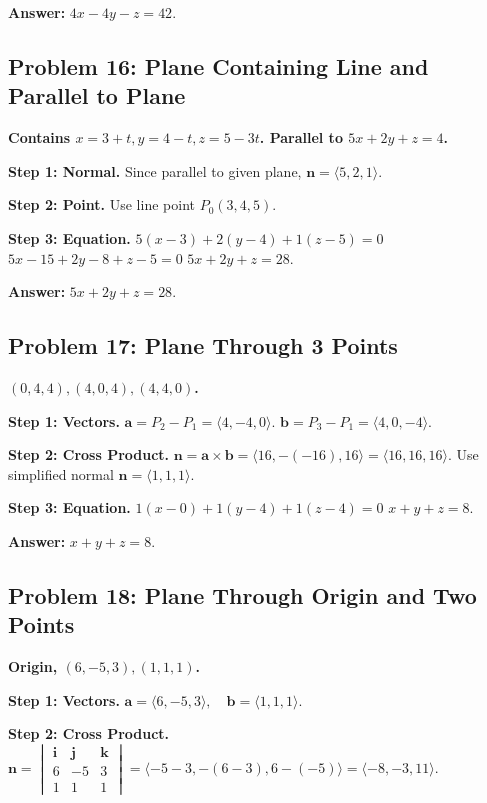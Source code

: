 \documentclass[11pt]{article}
\begin{document}
\textbf{Answer:}
$4x - 4y - z = 42$.

\hrulefill

\subsection*{Problem 16: Plane Containing Line and Parallel to Plane}
\textbf{Contains $x=3+t, y=4-t, z=5-3t$. Parallel to $5x + 2y + z = 4$.}

\textbf{Step 1: Normal.}
Since parallel to given plane, $\mathbf{n} = \langle 5, 2, 1 \rangle$.

\textbf{Step 2: Point.}
Use line point $P_0(3, 4, 5)$.

\textbf{Step 3: Equation.}
$5(x-3) + 2(y-4) + 1(z-5) = 0$
$5x - 15 + 2y - 8 + z - 5 = 0$
$5x + 2y + z = 28$.

\textbf{Answer:}
$5x + 2y + z = 28$.

\hrulefill

\subsection*{Problem 17: Plane Through 3 Points}
\textbf{$(0,4,4), (4,0,4), (4,4,0)$.}

\textbf{Step 1: Vectors.}
$\mathbf{a} = P_2 - P_1 = \langle 4, -4, 0 \rangle$.
$\mathbf{b} = P_3 - P_1 = \langle 4, 0, -4 \rangle$.

\textbf{Step 2: Cross Product.}
$\mathbf{n} = \mathbf{a} \times \mathbf{b} = \langle 16, -(-16), 16 \rangle = \langle 16, 16, 16 \rangle$.
Use simplified normal $\mathbf{n} = \langle 1, 1, 1 \rangle$.

\textbf{Step 3: Equation.}
$1(x-0) + 1(y-4) + 1(z-4) = 0$
$x + y + z = 8$.

\textbf{Answer:}
$x + y + z = 8$.

\hrulefill

\subsection*{Problem 18: Plane Through Origin and Two Points}
\textbf{Origin, $(6, -5, 3), (1, 1, 1)$.}

\textbf{Step 1: Vectors.}
$\mathbf{a} = \langle 6, -5, 3 \rangle, \quad \mathbf{b} = \langle 1, 1, 1 \rangle$.

\textbf{Step 2: Cross Product.}
$\mathbf{n} = \begin{vmatrix} \mathbf{i} & \mathbf{j} & \mathbf{k} \\ 6 & -5 & 3 \\ 1 & 1 & 1 \end{vmatrix} = \langle -5-3, -(6-3), 6-(-5) \rangle = \langle -8, -3, 11 \rangle$.
\end{document}
